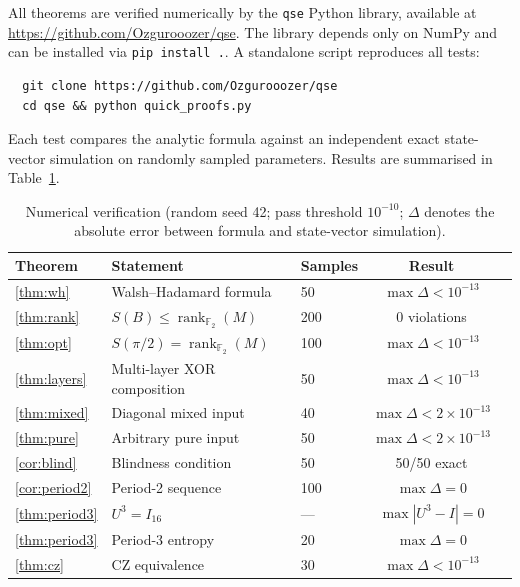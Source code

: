 \documentclass[11pt,a4paper]{article}
\newcommand{\F}{\mathbb{F}}
\newcommand{\rk}{\operatorname{rank}_{\F_2}}
\newcommand{\VNE}{S}
\begin{document}
All theorems are verified numerically by the \texttt{qse} Python library,
available at \url{https://github.com/Ozgurooozer/qse}.
The library depends only on NumPy and can be installed via
\texttt{pip install .}.  A standalone script reproduces all tests:
\begin{verbatim}
  git clone https://github.com/Ozgurooozer/qse
  cd qse && python quick_proofs.py
\end{verbatim}

Each test compares the analytic formula against an independent
exact state-vector simulation on randomly sampled parameters.
Results are summarised in Table~\ref{tab:results}.

\begin{table}[h]
\centering
\begin{tabular}{lllcc}
\toprule
Theorem & Statement & Samples & Result \\
\midrule
\ref{thm:wh}     & Walsh–Hadamard formula            & 50  & $\max\Delta < 10^{-13}$ \\
\ref{thm:rank}   & $\VNE(B) \leq \rk(M)$            & 200 & 0 violations            \\
\ref{thm:opt}    & $\VNE(\pi/2) = \rk(M)$           & 100 & $\max\Delta < 10^{-13}$ \\
\ref{thm:layers} & Multi-layer XOR composition       & 50  & $\max\Delta < 10^{-13}$ \\
\ref{thm:mixed}  & Diagonal mixed input              & 40  & $\max\Delta < 2\times10^{-13}$ \\
\ref{thm:pure}   & Arbitrary pure input              & 50  & $\max\Delta < 2\times10^{-13}$ \\
\ref{cor:blind}  & Blindness condition               & 50  & 50/50 exact             \\
\ref{cor:period2}& Period-2 sequence                 & 100 & $\max\Delta = 0$        \\
\ref{thm:period3}& $U^3 = I_{16}$                   & —   & $\max|U^3 - I| = 0$    \\
\ref{thm:period3}& Period-3 entropy                 & 20  & $\max\Delta = 0$        \\
\ref{thm:cz}     & CZ equivalence                    & 30  & $\max\Delta < 10^{-13}$ \\
\bottomrule
\end{tabular}
\caption{Numerical verification (random seed 42; pass threshold $10^{-10}$;
$\Delta$ denotes the absolute error between formula and state-vector simulation).}
\label{tab:results}
\end{table}
\end{document}
